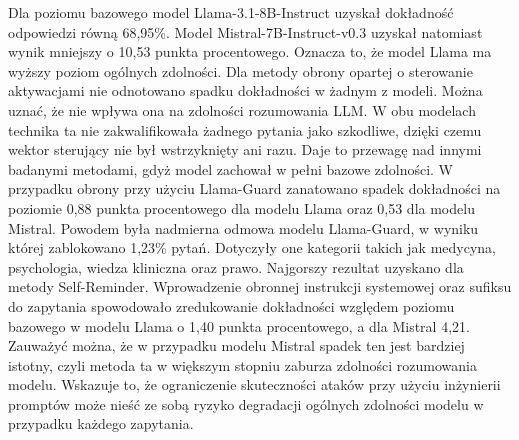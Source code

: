 Dla poziomu bazowego model Llama-3.1-8B-Instruct uzyskał dokładność odpowiedzi równą 68,95\%. Model Mistral-7B-Instruct-v0.3 uzyskał natomiast wynik mniejszy o 10,53 punkta procentowego. Oznacza to, że model Llama ma wyższy poziom ogólnych zdolności. Dla metody obrony opartej o sterowanie aktywacjami nie odnotowano spadku dokładności w żadnym z modeli. Można uznać, że nie wpływa ona na zdolności rozumowania \gls{LLM}. W obu modelach technika ta nie zakwalifikowała żadnego pytania jako szkodliwe, dzięki czemu wektor sterujący nie był wstrzyknięty ani razu. Daje to przewagę nad innymi badanymi metodami, gdyż model zachował w pełni bazowe zdolności. W przypadku obrony przy użyciu Llama-Guard zanatowano spadek dokładności na poziomie 0,88 punkta procentowego dla modelu Llama oraz 0,53 dla modelu Mistral. Powodem była nadmierna odmowa modelu Llama-Guard, w wyniku której zablokowano 1,23\% pytań. Dotyczyły one kategorii takich jak medycyna, psychologia, wiedza kliniczna oraz prawo. Najgorszy rezultat uzyskano dla metody Self-Reminder. Wprowadzenie obronnej instrukcji systemowej oraz sufiksu do zapytania spowodowało zredukowanie dokładności względem poziomu bazowego w modelu Llama o 1,40 punkta procentowego, a dla Mistral 4,21. Zauważyć można, że w przypadku modelu Mistral spadek ten jest bardziej istotny, czyli metoda ta w większym stopniu zaburza zdolności rozumowania modelu. Wskazuje to, że ograniczenie skuteczności ataków przy użyciu inżynierii promptów może nieść ze sobą ryzyko degradacji ogólnych zdolności modelu w przypadku każdego zapytania.